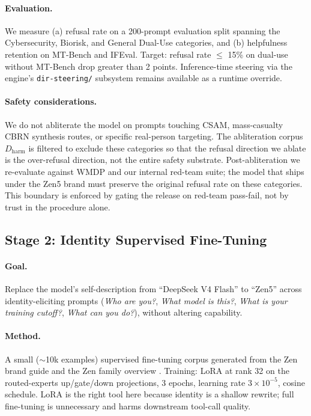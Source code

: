 \documentclass[11pt,a4paper]{article}
\begin{document}
\paragraph{Evaluation.} We measure (a) refusal rate on a 200-prompt evaluation split spanning the
Cybersecurity, Biorisk, and General Dual-Use categories, and (b) helpfulness retention on MT-Bench
and IFEval. Target: refusal rate $\leq$ 15\% on dual-use without MT-Bench drop greater than 2 points.
Inference-time steering via the engine's \texttt{dir-steering/} subsystem remains available as a
runtime override.

\paragraph{Safety considerations.} We do not abliterate the model on prompts touching CSAM,
mass-casualty CBRN synthesis routes, or specific real-person targeting. The abliteration corpus
$D_\text{harm}$ is filtered to exclude these categories so that the refusal direction we ablate is
the over-refusal direction, not the entire safety substrate. Post-abliteration we re-evaluate against
WMDP \cite{wmdp} and our internal red-team suite; the model that ships under the Zen5 brand must
preserve the original refusal rate on these categories. This boundary is enforced by gating the
release on red-team pass-fail, not by trust in the procedure alone.

\subsection{Stage 2: Identity Supervised Fine-Tuning}

\paragraph{Goal.} Replace the model's self-description from ``DeepSeek V4 Flash'' to ``Zen5'' across
identity-eliciting prompts (\emph{Who are you?}, \emph{What model is this?}, \emph{What is your
training cutoff?}, \emph{What can you do?}), without altering capability.

\paragraph{Method.} A small ($\sim$10k examples) supervised fine-tuning corpus
generated from the Zen brand guide and the Zen family overview \cite{zenfamily}.
Training: LoRA \cite{lora} at rank 32 on the routed-experts up/gate/down projections, 3 epochs,
learning rate $3 \times 10^{-5}$, cosine schedule. LoRA is the right tool here because identity is a
shallow rewrite; full fine-tuning is unnecessary and harms downstream tool-call quality.
\end{document}
